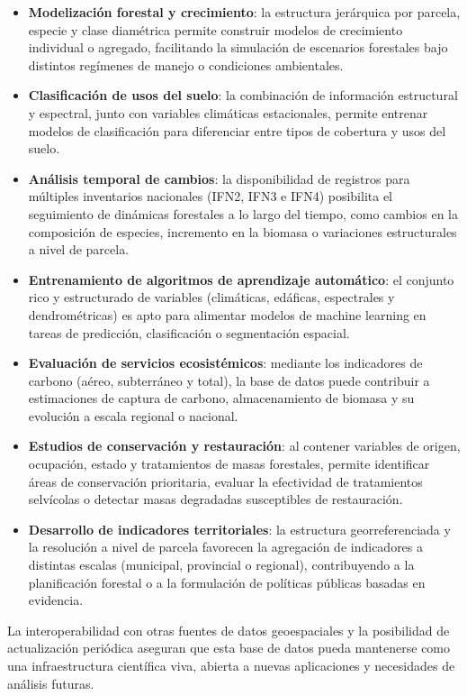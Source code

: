\begin{itemize}
    \item \textbf{Modelización forestal y crecimiento}: la estructura jerárquica por parcela, especie y clase diamétrica permite construir modelos de crecimiento individual o agregado, facilitando la simulación de escenarios forestales bajo distintos regímenes de manejo o condiciones ambientales.

    \item \textbf{Clasificación de usos del suelo}: la combinación de información estructural y espectral, junto con variables climáticas estacionales, permite entrenar modelos de clasificación para diferenciar entre tipos de cobertura y usos del suelo.

    \item \textbf{Análisis temporal de cambios}: la disponibilidad de registros para múltiples inventarios nacionales (IFN2, IFN3 e IFN4) posibilita el seguimiento de dinámicas forestales a lo largo del tiempo, como cambios en la composición de especies, incremento en la biomasa o variaciones estructurales a nivel de parcela.

    \item \textbf{Entrenamiento de algoritmos de aprendizaje automático}: el conjunto rico y estructurado de variables (climáticas, edáficas, espectrales y dendrométricas) es apto para alimentar modelos de machine learning en tareas de predicción, clasificación o segmentación espacial.

    \item \textbf{Evaluación de servicios ecosistémicos}: mediante los indicadores de carbono (aéreo, subterráneo y total), la base de datos puede contribuir a estimaciones de captura de carbono, almacenamiento de biomasa y su evolución a escala regional o nacional.

    \item \textbf{Estudios de conservación y restauración}: al contener variables de origen, ocupación, estado y tratamientos de masas forestales, permite identificar áreas de conservación prioritaria, evaluar la efectividad de tratamientos selvícolas o detectar masas degradadas susceptibles de restauración.

    \item \textbf{Desarrollo de indicadores territoriales}: la estructura georreferenciada y la resolución a nivel de parcela favorecen la agregación de indicadores a distintas escalas (municipal, provincial o regional), contribuyendo a la planificación forestal o a la formulación de políticas públicas basadas en evidencia.
\end{itemize}

La interoperabilidad con otras fuentes de datos geoespaciales y la posibilidad de actualización periódica aseguran que esta base de datos pueda mantenerse como una infraestructura científica viva, abierta a nuevas aplicaciones y necesidades de análisis futuras.


